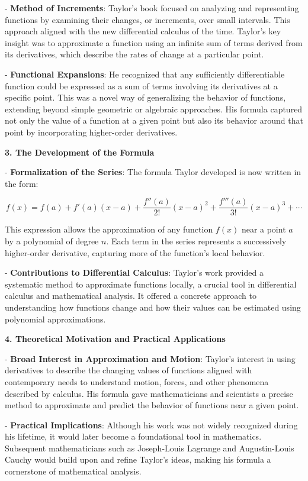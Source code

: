 \documentclass[a4paper,12pt]{book}
\begin{document}
- \textbf{Method of Increments}: Taylor’s book focused on analyzing and representing functions by examining their changes, or increments, over small intervals. This approach aligned with the new differential calculus of the time. Taylor’s key insight was to approximate a function using an infinite sum of terms derived from its derivatives, which describe the rates of change at a particular point.

- \textbf{Functional Expansions}: He recognized that any sufficiently differentiable function could be expressed as a sum of terms involving its derivatives at a specific point. This was a novel way of generalizing the behavior of functions, extending beyond simple geometric or algebraic approaches. His formula captured not only the value of a function at a given point but also its behavior around that point by incorporating higher-order derivatives.

\textbf{3. The Development of the Formula}

- \textbf{Formalization of the Series}: The formula Taylor developed is now written in the form:  

\[
  f(x) = f(a) + f'(a)(x - a) + \frac{f''(a)}{2!}(x - a)^2 + \frac{f'''(a)}{3!}(x - a)^3 + \cdots
\]
  
  This expression allows the approximation of any function \( f(x) \) near a point \( a \) by a polynomial of degree \( n \). Each term in the series represents a successively higher-order derivative, capturing more of the function’s local behavior.

- \textbf{Contributions to Differential Calculus}: Taylor’s work provided a systematic method to approximate functions locally, a crucial tool in differential calculus and mathematical analysis. It offered a concrete approach to understanding how functions change and how their values can be estimated using polynomial approximations.

\textbf{4. Theoretical Motivation and Practical Applications}

- \textbf{Broad Interest in Approximation and Motion}: Taylor’s interest in using derivatives to describe the changing values of functions aligned with contemporary needs to understand motion, forces, and other phenomena described by calculus. His formula gave mathematicians and scientists a precise method to approximate and predict the behavior of functions near a given point.

- \textbf{Practical Implications}: Although his work was not widely recognized during his lifetime, it would later become a foundational tool in mathematics. Subsequent mathematicians such as Joseph-Louis Lagrange and Augustin-Louis Cauchy would build upon and refine Taylor’s ideas, making his formula a cornerstone of mathematical analysis.
\end{document}
